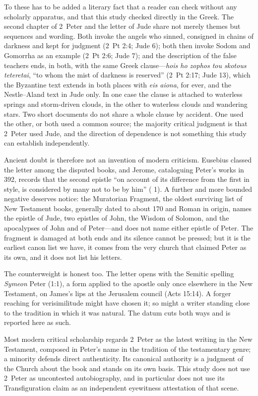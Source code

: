 To these has to be added a literary fact that a reader can check without any
scholarly apparatus, and that this study checked directly in the Greek. The
second chapter of 2~Peter and the letter of Jude share not merely themes but
sequences and wording. Both invoke the angels who sinned,
consigned in chains of darkness and kept for judgment (2~Pt 2:4; Jude 6);
both then invoke Sodom and Gomorrha as an example (2~Pt 2:6; Jude 7); and the
description of the false teachers ends, in both, with the same Greek
clause---\textit{hois ho zophos tou skotous teteretai}, ``to whom the mist of
darkness is reserved'' (2~Pt 2:17; Jude 13), which the Byzantine text extends
in both places with \textit{eis aiona}, for ever, and the Nestle--Aland text
in Jude only. In one case the clause is attached to waterless springs and
storm-driven clouds, in the other to waterless clouds and wandering stars.
Two short documents do not share a whole clause by accident.
One used the other, or both used a common source; the majority critical
judgment is that 2~Peter used Jude, and the direction of dependence is not
something this study can establish independently.

Ancient doubt is therefore not an invention of modern criticism. Eusebius
classed the letter among the disputed books, and Jerome, cataloguing Peter's
works in 392, records that the second epistle ``on account of its difference
from the first in style, is considered by many not to be by him''
( 1). A further and more bounded negative deserves
notice: the Muratorian Fragment, the oldest surviving list of New Testament
books, generally dated to about 170 and Roman in origin, names the epistle of
Jude, two epistles of John, the Wisdom of Solomon, and the apocalypses of
John and of Peter---and does not name either epistle of Peter. The fragment
is damaged at both ends and its silence cannot be pressed; but it is the
earliest canon list we have, it comes from the very church that claimed Peter
as its own, and it does not list his letters.

The counterweight is honest too. The letter opens with the Semitic spelling
\textit{Symeon} Peter (1:1), a form applied to the apostle only once
elsewhere in the New Testament, on James's lips at the Jerusalem council
(Acts 15:14). A forger reaching for verisimilitude might have chosen it; so
might a writer standing close to the tradition in which it was natural. The
datum cuts both ways and is reported here as such.

Most modern critical scholarship regards 2~Peter as the latest writing in the
New Testament, composed in Peter's name in the tradition of the testamentary
genre; a minority defends direct authenticity. Its canonical authority is a
judgment of the Church about the book and stands on its own basis. This study
does not use 2~Peter as uncontested autobiography, and in particular does not
use its Transfiguration claim as an independent eyewitness attestation of
that scene.

